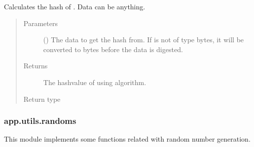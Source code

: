 \documentclass[letterpaper,10pt,english]{sphinxmanual}
\begin{document}
\begin{fulllineitems}
\label{\detokenize{app.utils:app.utils.crypto.sha256}}
Calculates the  hash of . Data can be anything.
\begin{quote}\begin{description}
\item[{Parameters}] \leavevmode
{} () \textendash{} The data to get the hash from. If  is not of type bytes,
it will be converted to bytes before the data is digested.

\item[{Returns}] \leavevmode
The hashvalue of  using  algorithm.

\item[{Return type}] \leavevmode
{}

\end{description}\end{quote}

\end{fulllineitems}



\subsubsection{app.utils.randoms}
\label{\detokenize{app.utils:module-app.utils.randoms}}\label{\detokenize{app.utils:app-utils-randoms}}
This module implements some functions related with random number generation.
\end{document}
